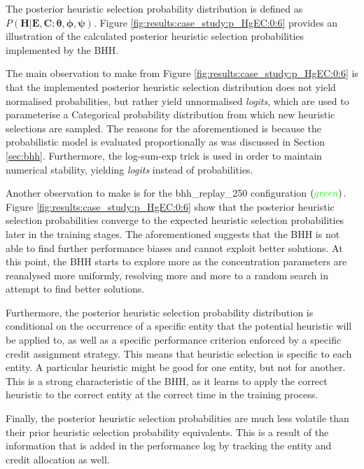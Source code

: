 The posterior heuristic selection probability distribution is defined as $P(\boldsymbol{H} \vert \boldsymbol{E}, \boldsymbol{C}; \boldsymbol{\theta}, \boldsymbol{\phi}, \boldsymbol{\psi})$. Figure \ref{fig:results:case_study:p_HgEC:0:6} provides an illustration of the calculated posterior heuristic selection probabilities implemented by the \acs{BHH}.

The main observation to make from Figure \ref{fig:results:case_study:p_HgEC:0:6} is that the implemented posterior heuristic selection distribution does not yield normalised probabilities, but rather yield unnormalised \textit{logits}, which are used to parameterise a Categorical probability distribution from which new heuristic selections are sampled. The reasons for the aforementioned is because the probabilistic model is evaluated proportionally as was discussed in Section \ref{sec:bhh}. Furthermore, the log-sum-exp trick is used in order to maintain numerical stability, yielding \textit{logits} instead of probabilities.

Another observation to make is for the bhh\_replay\_250 configuration $(\textcolor{green}{green})$. Figure \ref{fig:results:case_study:p_HgEC:0:6} show that the posterior heuristic selection probabilities converge to the expected heuristic selection probabilities later in the training stages. The aforementioned suggests that the \acs{BHH} is not able to find further performance biases and cannot exploit better solutions. At this point, the \acs{BHH} starts to explore more as the concentration parameters are reanalysed more uniformly, resolving more and more to a random search in attempt to find better solutions.

Furthermore, the posterior heuristic selection probability distribution is conditional on the occurrence of a specific entity that the potential heuristic will be applied to, as well as a specific performance criterion enforced by a specific credit assignment strategy. This means that heuristic selection is specific to each entity. A particular heuristic might be good for one entity, but not for another. This is a strong characteristic of the \acs{BHH}, as it learns to apply the correct heuristic to the correct entity at the correct time in the training process.

Finally, the posterior heuristic selection probabilities are much less volatile than their prior heuristic selection probability equivalents. This is a result of the information that is added in the performance log by tracking the entity and credit allocation as well.

